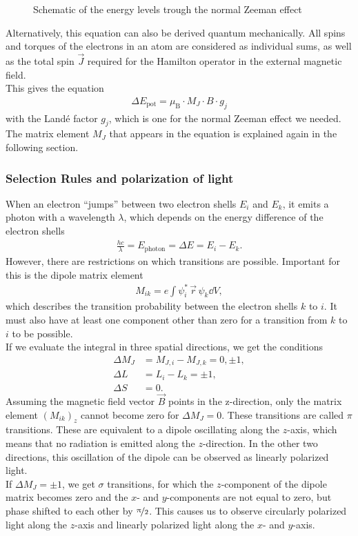 \begin{figure}[ht]
\centering

\caption{Schematic of the energy levels trough the normal Zeeman effect}
\label{fig:splitting}
\end{figure}

Alternatively, this equation can also be derived quantum mechanically.
All spins and torques of the electrons in an atom are considered as individual sums, as well as the total spin $\vec{J}$ required for the Hamilton operator in the external magnetic field.\\
This gives the equation
\begin{align}
\Delta E_\text{pot} = \mu_\text{B} \cdot M_J \cdot B \cdot g_j
\end{align}
with the Landé factor $g_j$, which is one for the normal Zeeman effect we needed.
The matrix element $M_J$ that appears in the equation is explained again in the following section.

\subsubsection{Selection Rules and polarization of light}
When an electron \enquote{jumps} between two electron shells $E_i$ and $E_k$, it emits a photon with a wavelength $\lambda$, which depends on the energy difference of the electron shells
\begin{align}
\frac{hc}{\lambda} = E_\text{photon} = \Delta E = E_i - E_k.
\end{align}
However, there are restrictions on which transitions are possible.
Important for this is the dipole matrix element
\begin{align}
M_{ik} = e \int \psi_i^* \, \vec{r} \, \psi_k \dd{V},
\end{align}
which describes the transition probability between the electron shells $k$ to $i$.
It must also have at least one component other than zero for a transition from $k$ to $i$ to be possible.\\
If we evaluate the integral in three spatial directions, we get the conditions
\begin{align}
\Delta M_J &= M_{J,i} - M_{J,k} = 0, \pm 1,\\
\Delta L &= L_i - L_k = \pm 1,\\
\Delta S &= 0.
\end{align}
Assuming the magnetic field vector $\vec{B}$ points in the z-direction, only the matrix element $(M_{ik})_z$ cannot become zero for $\Delta M_J = 0$.
These transitions are called $\pi$ transitions.
These are equivalent to a dipole oscillating along the $z$-axis, which means that no radiation is emitted along the $z$-direction. In the other two directions, this oscillation of the dipole can be observed as linearly polarized light.\\
If $\Delta M_J = \pm 1$, we get $\sigma$ transitions, for which the $z$-component of the dipole matrix becomes zero and the $x$- and $y$-components are not equal to zero, but phase shifted to each other by $\nicefrac{\pi}{2}$.
This causes us to observe circularly polarized light along the $z$-axis and linearly polarized light along the $x$- and $y$-axis.\\

